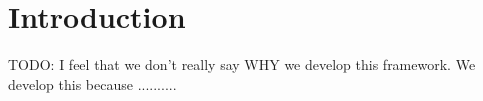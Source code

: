 \documentclass[twoside,a4paper]{article}
\title{\papertitle}
\begin{document}

\maketitle





%
\begin{abstract} %
%

Jamoma Multicore is a framework for creating graph structures in which unit generators are connected together to process multichannel audio in real-time.  
Current applications focus on multichannel audio processing in Max/MSP and PureData as well as live audio coding in Ruby.  
Jamoma Multicore is particularly well-suited to spatial audio contexts demanding large numbers of audio channels, such as Higher Order Ambisonics, Wave Field Synthesis and microphone arrays for beamforming.
Jamoma Multicore forms part of the Jamoma layered architecture.

\end{abstract} %




%
\section{Introduction} %
%

\label{sec:intro}
TODO: I feel that we don't really say WHY we develop this framework. We develop this because .......... 
\end{document}
